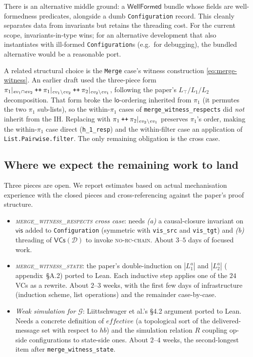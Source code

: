 \documentclass[11pt,a4paper]{article}
\theoremstyle{definition}
\theoremstyle{remark}
\newcommand{\RDT}{\ensuremath{\mathcal{D}}}
\newcommand{\mvis}{\mathsf{vis}}
\newcommand{\mlo}{\mathsf{lo}}
\newcommand{\ev}{\mathit{ev}}
\newcommand{\VCs}{\mathsf{VCs}}
\newcommand{\Emul}{\mathcal{G}}
\begin{document}
There is an alternative middle ground: a
$\mathsf{WellFormed}$ bundle whose fields are well-formedness
predicates, alongside a dumb \texttt{Configuration} record. This
cleanly separates data from invariants but retains the threading
cost. For the current scope, invariants-in-type wins; for an
alternative development that also instantiates with ill-formed
\texttt{Configuration}s (e.g.\ for debugging), the bundled
alternative would be a reasonable port.

A related structural choice is the \texttt{Merge} case's witness
construction \eqref{eq:merge-witness}. An earlier draft used the
three-piece form
$\pi_1|_{\ev_1 \cap \ev_2} \mathbin{\text{\tt ++}}
 \pi_1|_{\ev_1 \setminus \ev_2} \mathbin{\text{\tt ++}}
 \pi_2|_{\ev_2 \setminus \ev_1}$, following the paper's $L_\top /
L_1 / L_2$ decomposition. That form broke the $\mlo$-ordering
inherited from $\pi_1$ (it permutes the two $\pi_1$ sub-lists), so
the within-$\pi_1$ cases of
\texttt{merge\_witness\_respects} did \emph{not} inherit from the
IH. Replacing with $\pi_1 \mathbin{\text{\tt ++}}
\pi_2|_{\ev_2 \setminus \ev_1}$ preserves $\pi_1$'s order, making
the within-$\pi_1$ case direct (\texttt{h\_1\_resp}) and the
within-filter case an application of \texttt{List.Pairwise.filter}.
The only remaining obligation is the cross case.

\subsection{Where we expect the remaining work to land}

Three pieces are open. We report estimates based on actual
mechanisation experience with the closed pieces and cross-referencing
against the paper's proof structure.

\begin{itemize}[leftmargin=*]
  \item \emph{\textsc{merge\_witness\_respects} cross case}:
    needs \emph{(a)} a causal-closure invariant on $\mvis$ added to
    \texttt{Configuration} (symmetric with \texttt{vis\_src} and
    \texttt{vis\_tgt}) and \emph{(b)} threading of $\VCs(\RDT)$ to
    invoke \textsc{no-rc-chain}. About $3$--$5$ days of focused work.
  \item \emph{\textsc{merge\_witness\_state}}: the paper's
    double-induction on $|L_1^a|$ and $|L_2^a|$
    (\cite{sal2025} appendix~\S A.2) ported to Lean. Each
    inductive step applies one of the $24$ VCs as a rewrite. About
    $2$--$3$ weeks, with the first few days of infrastructure
    (induction scheme, list operations) and the remainder case-by-case.
  \item \emph{Weak simulation for $\Emul$}: Liittschwager et
    al.'s §4.2 argument ported to Lean. Needs a concrete definition
    of $\mathit{effective}$ (a topological sort of the delivered-message
    set with respect to $\mathit{hb}$) and the simulation relation
    $R$ coupling op-side configurations to state-side ones. About
    $2$--$4$ weeks, the second-longest item after
    \texttt{merge\_witness\_state}.
\end{itemize}
\end{document}
